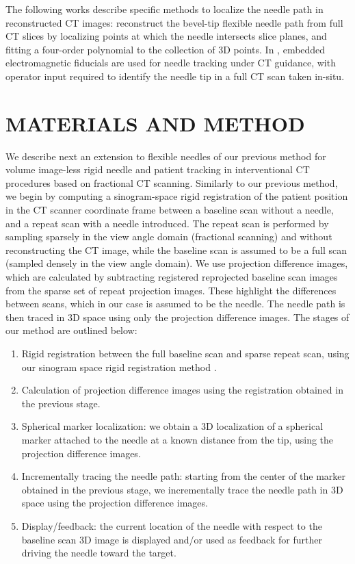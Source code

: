 \documentclass[letterpaper, 10 pt, conference]{ieeeconf}  %
\begin{document}
The following works describe specific methods to localize the needle path in reconstructed CT images:
\cite{huo2015shape} reconstruct the bevel-tip flexible needle path from full CT slices by localizing points at which the needle intersects slice planes, and fitting a four-order polynomial to the collection of 3D points.
In \cite{yaniv2010needle}, embedded electromagnetic fiducials are used for needle tracking under CT guidance, with operator input required to identify the needle tip in a full CT scan taken in-situ.

\section{MATERIALS AND METHOD}

We describe next an extension to flexible needles of our previous method \cite{medan2017reduced} for volume image-less rigid needle and patient tracking in interventional CT procedures based on fractional CT scanning. Similarly to our previous method, we begin by computing a sinogram-space rigid registration of the patient position in the CT scanner coordinate frame between a baseline scan without a needle, and a repeat scan with a needle introduced. The repeat scan is performed by sampling sparsely in the view angle domain (fractional scanning) and without reconstructing the CT image, while the baseline scan is assumed to be a full scan (sampled densely in the view angle domain). We use projection difference images, which are calculated by subtracting registered reprojected baseline scan images from the sparse set of repeat projection images. These highlight the differences between scans, which in our case is assumed to be the needle. The needle path is then traced in 3D space using only the projection difference images. The stages of our method are outlined below:
\begin{enumerate}
\item Rigid registration between the full baseline scan and sparse repeat scan, using our sinogram space rigid registration method \cite{medan2017sparse}.
\item Calculation of projection difference images using the registration obtained in the previous stage.
\item Spherical marker localization: we obtain a 3D localization of a spherical marker attached to the needle at a known distance from the tip, using the projection difference images.
\item Incrementally tracing the needle path: starting from the center of the marker obtained in the previous stage, we incrementally trace the needle path in 3D space using the projection difference images.
\item Display/feedback: the current location of the needle with respect to the baseline scan 3D image is displayed and/or used as feedback for further driving the needle toward the target.
\end{enumerate}
\end{document}
